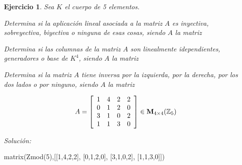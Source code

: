 \documentclass[12pt]{amsart}
\newtheorem{ejer}{Ejercicio}
\begin{document}
\begin{ejer} Sea $K$ el cuerpo de 5 elementos.
\newline
\noindent\begin{minipage}{\textwidth}
\begin{tcolorbox}[colback = green!20!white,title=Versión Aplicaciones]
Determina si la aplicaci\'on lineal asociada a la matriz $A$ es inyectiva, sobreyectiva, biyectiva o ninguna de esas cosas, siendo $A$ la matriz \end{tcolorbox}
\end{minipage} \newline
\noindent\begin{minipage}{\textwidth}
\begin{tcolorbox}[colback = blue!20!white,title=Versión Vectores]
Determina si las columnas de la matriz $A$ son linealmente idependientes, generadores o base de $K^{4}$, siendo $A$ la matriz \end{tcolorbox}
\end{minipage} \newline
\noindent\begin{minipage}{\textwidth} 
\begin{tcolorbox}[colback = red!20!white,title=Versión Inversas]
Determina si la matriz $A$ tiene inversa por la izquierda, por la derecha, por los dos lados o por ninguno, siendo $A$ la matriz 
\end{tcolorbox}
\end{minipage}
\[ A = \left[\begin{array}{rrrr}
1 & 4 & 2 & 2 \\
0 & 1 & 2 & 0 \\
3 & 1 & 0 & 2 \\
1 & 1 & 3 & 0
\end{array}\right] \in {\bf M}_{4\times 4}({\mathbb Z}_{5})\]
\end{ejer}

{\it Soluci\'on:}

\begin{sageblock}
matrix(Zmod(5),[[1,4,2,2],
[0,1,2,0],
[3,1,0,2],
[1,1,3,0]])
\end{sageblock}

\end{document}
